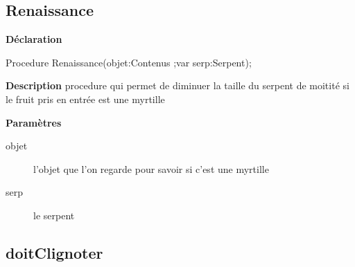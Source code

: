 \documentclass{report}
\newif\ifpdf
\begin{document}
\subsection*{Renaissance}
\fi
\label{Jouer-Renaissance}
\begin{list}{}{
\setlength{\itemindent}{0cm}
\setlength{\listparindent}{0cm}
\setlength{\leftmargin}{\evensidemargin}
\addtolength{\leftmargin}{\tmplength}
\settowidth{\labelsep}{X}
\addtolength{\leftmargin}{\labelsep}
\setlength{\labelwidth}{\tmplength}
}
\item[\textbf{Déclaration}\hfill]
\ifpdf
\begin{flushleft}
\fi
\begin{ttfamily}
Procedure Renaissance(objet:Contenus ;var serp:Serpent);\end{ttfamily}

\ifpdf
\end{flushleft}
\fi

\par
\item[\textbf{Description}]
procedure qui permet de diminuer la taille du serpent de moitité si le fruit pris en entrée est une myrtille  \par
\item[\textbf{Paramètres}]
\begin{description}
\item[objet] l'objet que l'on regarde pour savoir si c'est une myrtille
\item[serp] le serpent
\end{description}


\end{list}
\ifpdf
\subsection*{\large{\textbf{doitClignoter}}\normalsize\hspace{1ex}\hrulefill}
\else
\end{document}
